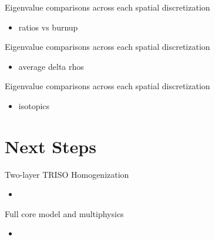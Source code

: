 \documentclass[9pt,t,aspectratio=169]{beamer}
\begin{document}
\begin{frame}{Eigenvalue comparisons across each spatial discretization}
    \begin{itemize}
        \item ratios vs burnup
    \end{itemize}
\end{frame}

\begin{frame}{Eigenvalue comparisons across each spatial discretization}
    \begin{itemize}
        \item average delta rhos
    \end{itemize}
\end{frame}

\begin{frame}{Eigenvalue comparisons across each spatial discretization}
    \begin{itemize}
        \item isotopics
    \end{itemize}
\end{frame}

\section{Next Steps}
\begin{frame}{Two-layer TRISO Homogenization}
    \begin{itemize}
        \item
    \end{itemize}
\end{frame}

\begin{frame}{Full core model and multiphysics}
    \begin{itemize}
        \item
    \end{itemize}
\end{frame}


\end{document}
